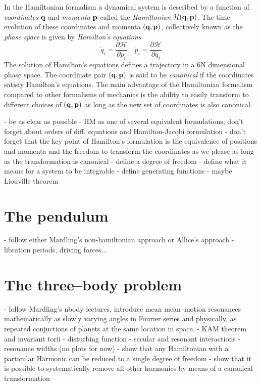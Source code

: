 In the Hamiltonian formalism a dynamical system is described by 
a function of \emph{coordinates} $\boldsymbol{\mathbf{q}}$ and \emph{momenta} 
$\boldsymbol{\mathbf{p}}$ called the \emph{Hamiltonian} $\mathcal{H}(\boldsymbol{\mathbf{q}},
\boldsymbol{\mathbf{p}})$. The time evolution of these coordinates and momenta
$(\boldsymbol{\mathbf{q}},\boldsymbol{\mathbf{p}})$, collectively known as the \emph{phase space} 
is given by \emph{Hamilton's equations} 
\begin{equation}
    \dot{q}_i= \frac{\partial \mathcal{H}}{\partial p_i}\quad
    \dot{p}_i= \frac{\partial \mathcal{H}}{\partial q_i} 
\end{equation}
The solution of Hamilton's equations defines a trajectory in a 
6N dimensional phase space. The coordinate pair $(\boldsymbol{\mathbf{q}},\boldsymbol{\mathbf{p}})$
is said to be \emph{canonical} if the coordinates satisfy 
Hamilton's equations. The main advantage of the Hamiltonian
formalism compared to other formalisms of mechanics is the ability
to easily transform to different choices of $(\boldsymbol{\mathbf{q}},\boldsymbol{\mathbf{p}})$
as long as the new set of coordinates is also canonical. 


- be as clear as possible
- HM as one of several equivalent formulations, don't forget about
orders of diff. equations and Hamilton-Jacobi formulation
- don't forget that the key point of Hamilton's formulation is 
the equivalence of positions and momenta and the freedom to transform
the coordinates as we please as long as the transformation is canonical
- define a degree of freedom
- define what it means for a system to be integrable
- define generating functions
- maybe Liouville theorem

\section{The pendulum}
\label{sec:pendulum}
- follow either Mardling's non-hamiltonian approach or Allice's approach
- libration periods, driving forces...

\section{The three--body problem}
\label{sec:three_body}
- follow Mardling's nbody lectures, introduce mean mean--motion
resonances mathematically as slowly varying angles in  Fourier series
and physically, as repeated conjuctions of planets at the same location
in space.
- KAM theorem and invariant torii
- disturbing function
- secular and resonant interactions
- resonance widths (no plots for now)
- show that any Hamiltonian with a particular Harmonic can be reduced to
a single degree of freedom
- show that it is possible to systematically remove all other harmonics
by means of a canonical transformation
